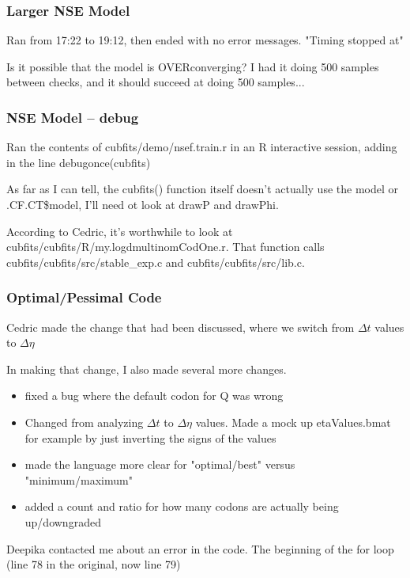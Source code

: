 \subsubsection{Larger NSE Model}

Ran from 17:22 to 19:12, then ended with no error messages. "Timing stopped at"

Is it possible that the model is OVERconverging? I had it doing 500 samples between checks, and it should succeed at doing 500 samples...


\subsubsection{NSE Model -- debug}

Ran the contents of cubfits/demo/nsef.train.r in an R interactive session, adding in the line debugonce(cubfits)

As far as I can tell, the cubfits() function itself doesn't actually use the model or .CF.CT\$model, I'll need ot look at drawP and drawPhi.

According to Cedric, it's worthwhile to look at cubfits/cubfits/R/my.logdmultinomCodOne.r. That function calls cubfits/cubfits/src/stable\_exp.c and cubfits/cubfits/src/lib.c.


\subsubsection{Optimal/Pessimal Code}

Cedric made the change that had been discussed, where we switch from $\Delta t$ values to $\Delta\eta$

In making that change, I also made several more changes.

\begin{itemize}
\item fixed a bug where the default codon for Q was wrong
\item Changed from analyzing $\Delta t$ to $\Delta\eta$ values. Made a mock up etaValues.bmat for example by just inverting the signs of the values
\item made the language more clear for "optimal/best" versus "minimum/maximum"
\item added a count and ratio for how many codons are actually being up/downgraded
\end{itemize}

Deepika contacted me about an error in the code. The beginning of the for loop (line 78 in the original, now line 79)

